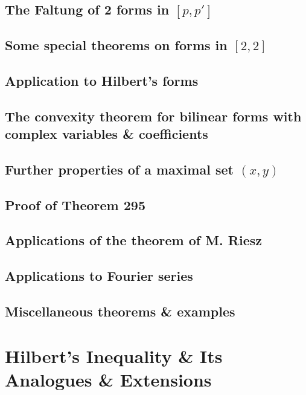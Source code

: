 \documentclass[oneside]{book}
\numberwithin{equation}{section}
\begin{document}
\subsection{The Faltung of 2 forms in $[p,p']$}

\subsection{Some special theorems on forms in $[2,2]$}

\subsection{Application to Hilbert's forms}

\subsection{The convexity theorem for bilinear forms with complex variables \& coefficients}

\subsection{Further properties of a maximal set $(x,y)$}

\subsection{Proof of Theorem 295}

\subsection{Applications of the theorem of M. Riesz}

\subsection{Applications to Fourier series}

\subsection{Miscellaneous theorems \& examples}


\section{Hilbert's Inequality \& Its Analogues \& Extensions}
\end{document}
